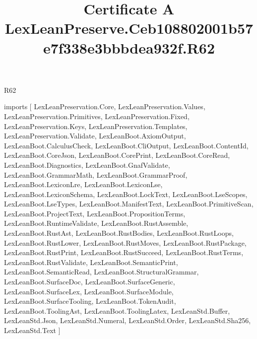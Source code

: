 \begin{lexlean}{R62}
\title{Certificate A LexLeanPreserve.Ceb108802001b57e7f338e3bbbdea932f.R62}
\begin{coremodule}
imports [
  LexLeanPreservation.Core,
  LexLeanPreservation.Values,
  LexLeanPreservation.Primitives,
  LexLeanPreservation.Fixed,
  LexLeanPreservation.Keys,
  LexLeanPreservation.Templates,
  LexLeanPreservation.Validate,
  LexLeanBoot.AxiomOutput,
  LexLeanBoot.CalculusCheck,
  LexLeanBoot.CliOutput,
  LexLeanBoot.ContentId,
  LexLeanBoot.CoreJson,
  LexLeanBoot.CorePrint,
  LexLeanBoot.CoreRead,
  LexLeanBoot.Diagnostics,
  LexLeanBoot.GnafValidate,
  LexLeanBoot.GrammarMath,
  LexLeanBoot.GrammarProof,
  LexLeanBoot.LexiconLre,
  LexLeanBoot.LexiconLse,
  LexLeanBoot.LexiconSchema,
  LexLeanBoot.LockText,
  LexLeanBoot.LseScopes,
  LexLeanBoot.LseTypes,
  LexLeanBoot.ManifestText,
  LexLeanBoot.PrimitiveScan,
  LexLeanBoot.ProjectText,
  LexLeanBoot.PropositionTerms,
  LexLeanBoot.RuntimeValidate,
  LexLeanBoot.RustAssemble,
  LexLeanBoot.RustAst,
  LexLeanBoot.RustBodies,
  LexLeanBoot.RustLoops,
  LexLeanBoot.RustLower,
  LexLeanBoot.RustMoves,
  LexLeanBoot.RustPackage,
  LexLeanBoot.RustPrint,
  LexLeanBoot.RustSucceed,
  LexLeanBoot.RustTerms,
  LexLeanBoot.RustValidate,
  LexLeanBoot.SemanticPrint,
  LexLeanBoot.SemanticRead,
  LexLeanBoot.StructuralGrammar,
  LexLeanBoot.SurfaceDoc,
  LexLeanBoot.SurfaceGeneric,
  LexLeanBoot.SurfaceLex,
  LexLeanBoot.SurfaceModule,
  LexLeanBoot.SurfaceTooling,
  LexLeanBoot.TokenAudit,
  LexLeanBoot.ToolingAst,
  LexLeanBoot.ToolingLatex,
  LexLeanStd.Buffer,
  LexLeanStd.Json,
  LexLeanStd.Numeral,
  LexLeanStd.Order,
  LexLeanStd.Sha256,
  LexLeanStd.Text
]


\end{coremodule}
\end{lexlean}

